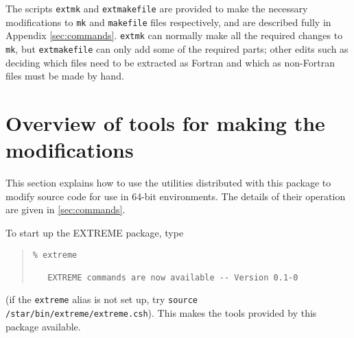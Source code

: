 \documentclass[twoside,11pt]{article}
\newcommand{\htmlref}[2]{#1}
\renewcommand{\_}{\texttt{\symbol{95}}}
\newcommand{\xroutine}[1]{\htmlref{{\tt #1}}{#1}}
\newcommand{\file}[1]{{\tt #1}}
\newenvironment{squote}{\begin{quote}\begin{small}}{\end{small}\end{quote}}
\begin{document}
The scripts \xroutine{extmk} and \xroutine{extmakefile} 
are provided to make the necessary 
modifications to \file{mk} and \file{makefile} files respectively, 
and are described fully in Appendix \ref{sec:commands}.
\xroutine{extmk} can normally make all the required changes to \file{mk},
but \xroutine{extmakefile} can only add some of the required parts;
other edits such as deciding which files need to be extracted as Fortran
and which as non-Fortran files must be made by hand.


\section{Overview of tools for making the modifications\label{sec:tools}}

This section explains how to use the utilities distributed with this package
to modify source code for use in 64-bit environments.
The details of their operation are given in \ref{sec:commands}.

To start up the EXTREME package, type
\begin{squote}
\begin{verbatim}
% extreme
 
   EXTREME commands are now available -- Version 0.1-0
\end{verbatim}
\end{squote}
(if the {\tt extreme} alias is not set up, 
try {\tt source /star/bin/extreme/extreme.csh}).
This makes the tools provided by this package available.
\end{document}
